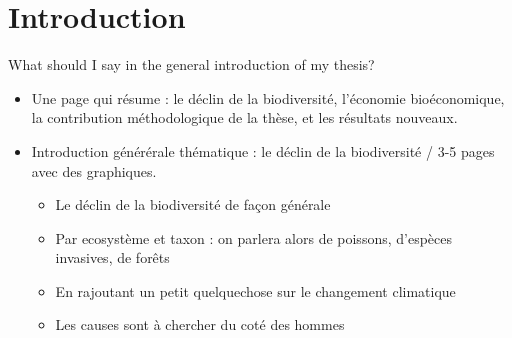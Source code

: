 \chapter*{Introduction}
\label{Introduction}

What should I say in the general introduction of my thesis? 

\begin{itemize}
\item Une page qui résume : le déclin de la biodiversité, l'économie bioéconomique, la contribution méthodologique de la thèse, et les résultats nouveaux. 

\item Introduction générérale thématique : le déclin de la biodiversité / 3-5 pages avec des graphiques. 
\begin{itemize}
\item Le déclin de la biodiversité de façon générale
\item Par ecosystème et taxon : on parlera alors de poissons, d'espèces invasives, de forêts
\item En rajoutant un petit quelquechose sur le changement climatique
\item Les causes sont à chercher du coté des hommes
\end{itemize}


\end{itemize}
